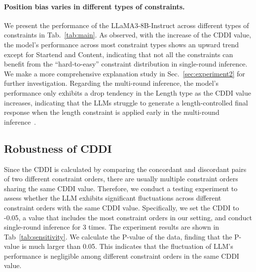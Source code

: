 \paragraph*{Position bias varies in different types of constraints.} We present the performance of the LLaMA3-8B-Instruct across different types of constraints in Tab.~\ref{tab:main}. As observed, with the increase of the CDDI value, the model's performance across most constraint types shows an upward trend except for Startend and Content, indicating that not all the constraints can benefit from the ``hard-to-easy'' constraint distribution in single-round inference. We make a more comprehensive explanation study in Sec.~\ref{sec:experiment2} for further investigation. Regarding the multi-round inference, the model's performance only exhibits a drop tendency in the Length type as the CDDI value increases, indicating that the LLMs struggle to generate a length-controlled final response when the length constraint is applied early in the multi-round inference~\cite{yuan2024following}.











\subsection{Robustness of CDDI}
Since the CDDI is calculated by comparing the concordant and discordant pairs of two different constraint orders, there are usually multiple constraint orders sharing the same CDDI value. Therefore, we conduct a testing experiment to assess whether the LLM exhibits significant fluctuations across different constraint orders with the same CDDI value. Specifically, we set the CDDI to -0.05, a value that includes the most constraint orders in our setting, and conduct single-round inference for 3 times. The experiment results are shown in Tab~\ref{tab:sensitivity}. We calculate the P-value of the data, finding that the P-value is much larger than 0.05. This indicates that the fluctuation of LLM's performance is negligible among different constraint orders in the same CDDI value.


